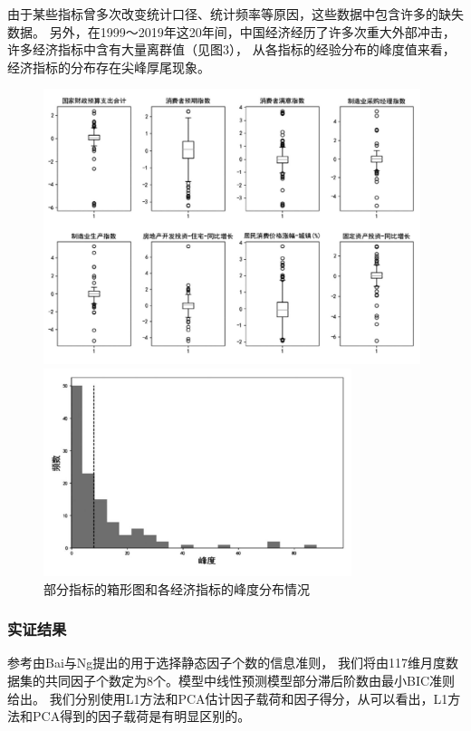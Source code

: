 由于某些指标曾多次改变统计口径、统计频率等原因，这些数据中包含许多的缺失数据。
另外，在1999～2019年这20年间，中国经济经历了许多次重大外部冲击，许多经济指标中含有大量离群值（见图3），
从各指标的经验分布的峰度值来看，经济指标的分布存在尖峰厚尾现象。
\begin{figure}[H]
    \begin{minipage}[t]{1\textwidth}
    \centering
    \includegraphics[width=11cm]{pics/some-indexes.jpg}
    \end{minipage}
    \begin{minipage}[t]{1\textwidth}
    \centering
    \includegraphics[width=9cm]{pics/fengdu.jpg}
    \end{minipage}
    \caption{\small 部分指标的箱形图和各经济指标的峰度分布情况}
\end{figure}

\subsubsection{实证结果}
参考由Bai与Ng提出的用于选择静态因子个数的信息准则，
我们将由117维月度数据集的共同因子个数定为8个。模型中线性预测模型部分滞后阶数由最小BIC准则给出。
我们分别使用L1方法和PCA估计因子载荷和因子得分，从可以看出，L1方法和PCA得到的因子载荷是有明显区别的。

